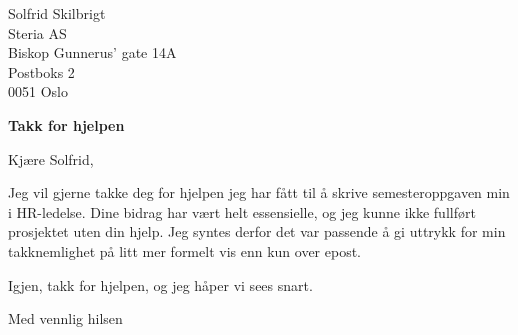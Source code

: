 \documentclass[letterpaper, 11pt]{letter}
\begin{document}
\begin{letter}{
	Solfrid Skilbrigt \\ 
	Steria AS \\
	Biskop Gunnerus' gate 14A \\ 
	Postboks 2 \\
	0051 Oslo
}

\opening{}
\vspace{2em}
\textbf{Takk for hjelpen}
\vspace{1.5em}

Kjære Solfrid,

Jeg vil gjerne takke deg for hjelpen jeg har fått til å skrive semesteroppgaven min i HR-ledelse. Dine bidrag har vært helt essensielle, og jeg kunne ikke fullført prosjektet uten din hjelp. Jeg syntes derfor det var passende å gi uttrykk for min takknemlighet på litt mer formelt vis enn kun over epost.

Igjen, takk for hjelpen, og jeg håper vi sees snart.

\vspace{3em}
\closing{Med vennlig hilsen}


\end{letter}
\end{document}
